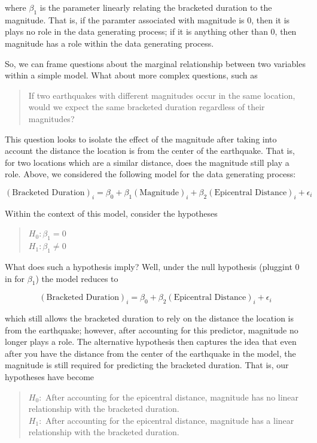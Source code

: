 \documentclass[]{book}
\theoremstyle{definition}
\theoremstyle{definition}
\theoremstyle{definition}
\theoremstyle{remark}
\begin{document}
where \(\beta_1\) is the parameter linearly relating the bracketed
duration to the magnitude. That is, if the paramter associated with
magnitude is 0, then it is plays no role in the data generating process;
if it is anything other than 0, then magnitude has a role within the
data generating process.

So, we can frame questions about the marginal relationship between two
variables within a simple model. What about more complex questions, such
as

\begin{quote}
If two earthquakes with different magnitudes occur in the same location,
would we expect the same bracketed duration regardless of their
magnitudes?
\end{quote}

This question looks to isolate the effect of the magnitude after taking
into account the distance the location is from the center of the
earthquake. That is, for two locations which are a similar distance,
does the magnitude still play a role. Above, we considered the following
model for the data generating process:

\[(\text{Bracketed Duration})_i = \beta_0 + \beta_1(\text{Magnitude})_i + \beta_2(\text{Epicentral Distance})_i + \epsilon_i\]

Within the context of this model, consider the hypotheses

\begin{quote}
\(H_0: \beta_1 = 0\)\\
\(H_1: \beta_1 \neq 0\)
\end{quote}

What does such a hypothesis imply? Well, under the null hypothesis
(pluggint 0 in for \(\beta_1\)) the model reduces to

\[(\text{Bracketed Duration})_i = \beta_0 + \beta_2(\text{Epicentral Distance})_i + \epsilon_i\]

which still allows the bracketed duration to rely on the distance the
location is from the earthquake; however, after accounting for this
predictor, magnitude no longer plays a role. The alternative hypothesis
then captures the idea that even after you have the distance from the
center of the earthquake in the model, the magnitude is still required
for predicting the bracketed duration. That is, our hypotheses have
become

\begin{quote}
\(H_0:\) After accounting for the epicentral distance, magnitude has no
linear relationship with the bracketed duration.\\
\(H_1:\) After accounting for the epicentral distance, magnitude has a
linear relationship with the bracketed duration.
\end{quote}
\end{document}
